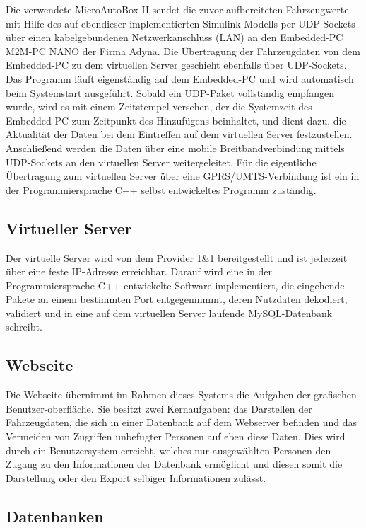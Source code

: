 \documentclass[fontsize = 12pt, paper = a4]{scrreprt}
\begin{document}
Die verwendete MicroAutoBox II sendet die zuvor aufbereiteten Fahrzeugwerte mit Hilfe des auf ebendieser implementierten Simulink-Modells per UDP-Sockets über einen kabelgebundenen Netzwerkanschluss (LAN) an den Embedded-PC M2M-PC NANO der Firma Adyna. Die Übertragung der Fahrzeugdaten von dem Embedded-PC zu dem virtuellen Server geschieht ebenfalls über UDP-Sockets. Das Programm läuft eigenständig auf dem Embedded-PC und wird automatisch beim Systemstart ausgeführt. Sobald ein UDP-Paket vollständig empfangen wurde, wird es mit einem Zeitstempel versehen, der die Systemzeit des Embedded-PC zum Zeitpunkt des Hinzufügens beinhaltet, und dient dazu, die Aktualität der Daten bei dem Eintreffen auf dem virtuellen Server festzustellen. Anschließend werden die Daten über eine mobile Breitbandverbindung mittels UDP-Sockets an den virtuellen Server weitergeleitet. Für die eigentliche Übertragung zum virtuellen Server über eine GPRS/UMTS-Verbindung ist ein in der Programmiersprache C++ selbst entwickeltes Programm zuständig.		

\subsection{Virtueller Server}

Der virtuelle Server wird von dem Provider 1\&1 bereitgestellt und ist jederzeit über eine feste IP-Adresse erreichbar. Darauf wird eine in der Programmiersprache C++ entwickelte Software implementiert, die eingehende Pakete an einem bestimmten Port entgegennimmt, deren Nutzdaten dekodiert, validiert und in eine auf dem virtuellen Server laufende MySQL-Datenbank schreibt. 

\subsection{Webseite}

Die Webseite übernimmt im Rahmen dieses Systems die Aufgaben der grafischen Benutzer-oberfläche. Sie besitzt zwei Kernaufgaben: das Darstellen der Fahrzeugdaten, die sich in einer Datenbank auf dem Webserver befinden und das Vermeiden von Zugriffen unbefugter Personen auf eben diese Daten. Dies wird durch ein Benutzersystem erreicht, welches nur ausgewählten Personen den Zugang zu den Informationen der Datenbank ermöglicht und diesen somit die Darstellung oder den Export selbiger Informationen zulässt.

\subsection{Datenbanken}
\end{document}
